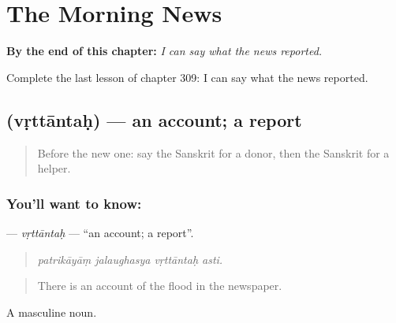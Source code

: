 
\chapter{The Morning News}
\label{ch:sa-the-morning-news}

\begin{chapteropening}
\textbf{By the end of this chapter:} \emph{I can say what the news reported.}

Complete the last lesson of chapter 309: I can say what the news reported.
\end{chapteropening}

\section[\texorpdfstring{\sk{वृत्तान्तः} (vṛttāntaḥ)}{वृत्तान्तः (vṛttāntaḥ)}]{ (vṛttāntaḥ) — an account; a report}

\label{lesson:SA-C309-vrttantah}



\begin{quote}
Before the new one: say the Sanskrit for a donor, then the Sanskrit for a helper.
\end{quote}

\subsection*{You'll want to know: }
\textbf{} — \emph{vṛttāntaḥ} — \textquotedblleft{}an account; a report\textquotedblright{}.

\begin{quote}
   
\end{quote}

\begin{quote}
\emph{patrikāyāṃ jalaughasya vṛttāntaḥ asti.}
\end{quote}

\begin{quote}
There is an account of the flood in the newspaper.
\end{quote}

A masculine noun.

